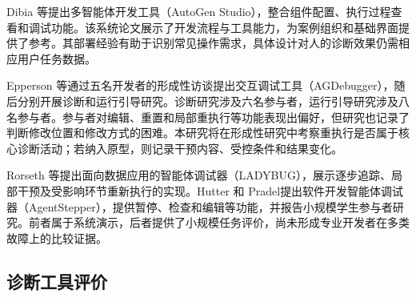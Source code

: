 Dibia 等\cite{ref25}提出多智能体开发工具（AutoGen Studio），整合组件配置、执行过程查看和调试功能。该系统论文展示了开发流程与工具能力，为案例组织和基础界面提供了参考。其部署经验有助于识别常见操作需求，具体设计对人的诊断效果仍需相应用户任务数据。

Epperson 等\cite{ref02}通过五名开发者的形成性访谈提出交互调试工具（AGDebugger），随后分别开展诊断和运行引导研究。诊断研究涉及六名参与者，运行引导研究涉及八名参与者。参与者对编辑、重置和局部重执行等功能表现出偏好，但研究也记录了判断修改位置和修改方式的困难。本研究将在形成性研究中考察重执行是否属于核心诊断活动；若纳入原型，则记录干预内容、受控条件和结果变化。

Rorseth 等\cite{ref28}提出面向数据应用的智能体调试器（LADYBUG），展示逐步追踪、局部干预及受影响环节重新执行的实现。Hutter 和 Pradel\cite{ref18}提出软件开发智能体调试器（AgentStepper），提供暂停、检查和编辑等功能，并报告小规模学生参与者研究。前者属于系统演示，后者提供了小规模任务评价，尚未形成专业开发者在多类故障上的比较证据。

\subsection{诊断工具评价}

